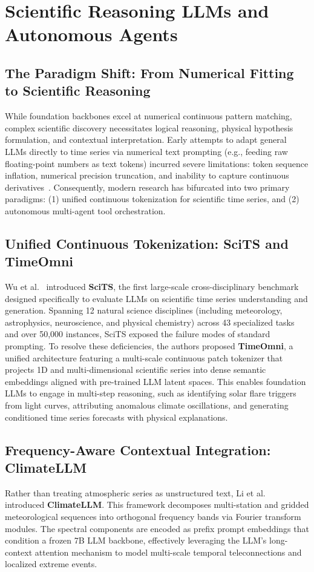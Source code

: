 \section{Scientific Reasoning LLMs and Autonomous Agents}
\label{sec:reasoning_llms}

\subsection{The Paradigm Shift: From Numerical Fitting to Scientific Reasoning}
While foundation backbones excel at numerical continuous pattern matching, complex scientific discovery necessitates logical reasoning, physical hypothesis formulation, and contextual interpretation. Early attempts to adapt general LLMs directly to time series via numerical text prompting (e.g., feeding raw floating-point numbers as text tokens) incurred severe limitations: token sequence inflation, numerical precision truncation, and inability to capture continuous derivatives~\cite{jin2024whatcan}. Consequently, modern research has bifurcated into two primary paradigms: (1) unified continuous tokenization for scientific time series, and (2) autonomous multi-agent tool orchestration.

\subsection{Unified Continuous Tokenization: SciTS and TimeOmni}
Wu et al.~\cite{wu2025scits} introduced \textbf{SciTS}, the first large-scale cross-disciplinary benchmark designed specifically to evaluate LLMs on scientific time series understanding and generation. Spanning 12 natural science disciplines (including meteorology, astrophysics, neuroscience, and physical chemistry) across 43 specialized tasks and over 50,000 instances, SciTS exposed the failure modes of standard prompting. To resolve these deficiencies, the authors proposed \textbf{TimeOmni}, a unified architecture featuring a multi-scale continuous patch tokenizer that projects 1D and multi-dimensional scientific series into dense semantic embeddings aligned with pre-trained LLM latent spaces. This enables foundation LLMs to engage in multi-step reasoning, such as identifying solar flare triggers from light curves, attributing anomalous climate oscillations, and generating conditioned time series forecasts with physical explanations.

\subsection{Frequency-Aware Contextual Integration: ClimateLLM}
Rather than treating atmospheric series as unstructured text, Li et al.~\cite{li2025climatellm} introduced \textbf{ClimateLLM}. This framework decomposes multi-station and gridded meteorological sequences into orthogonal frequency bands via Fourier transform modules. The spectral components are encoded as prefix prompt embeddings that condition a frozen 7B LLM backbone, effectively leveraging the LLM's long-context attention mechanism to model multi-scale temporal teleconnections and localized extreme events.

